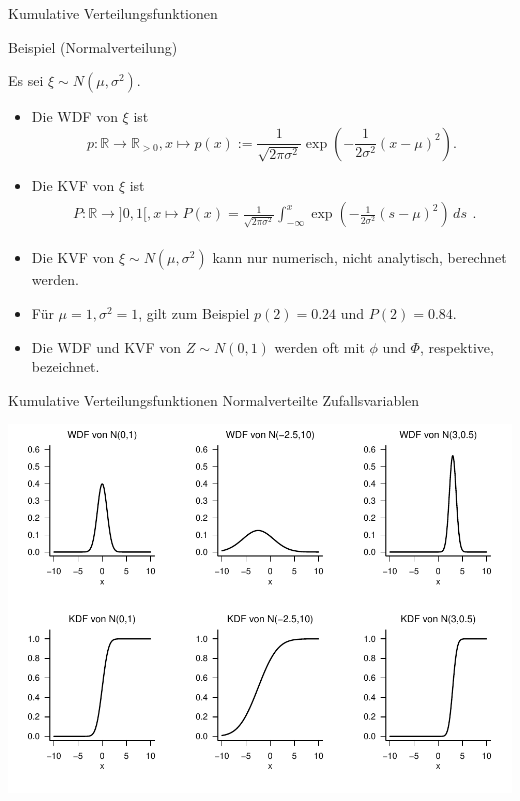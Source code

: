 \documentclass[
  8pt,
  ignorenonframetext,
]{beamer}
\begin{document}
\begin{frame}{Kumulative Verteilungsfunktionen}
\protect\hypertarget{kumulative-verteilungsfunktionen-9}{}
\begin{large}
Beispiel (Normalverteilung)
\end{large}

\small
\justifying

Es sei \(\xi \sim N(\mu,\sigma^2)\). 

\begin{itemize}
\item Die WDF von $\xi$ ist
\begin{equation*}
p : \mathbb{R} \to \mathbb{R}_{>0}, x \mapsto p(x)
:= \frac{1}{\sqrt{2\pi\sigma^2}}\exp\left(-\frac{1}{2\sigma^2}(x-\mu)^2\right).
\end{equation*}
\item Die KVF von $\xi$ ist
\begin{align*}
\begin{split}
P : \mathbb{R} \to ]0,1[, x \mapsto P(x)
 = \frac{1}{\sqrt{2\pi\sigma^2}}\int_{-\infty}^x\exp\left(-\frac{1}{2\sigma^2}(s -\mu)^2\right) \,ds
\end{split}.
\end{align*}
\item Die KVF von $\xi \sim N(\mu,\sigma^2)$ kann nur numerisch, nicht analytisch, berechnet werden.
\item Für $\mu = 1, \sigma^2 = 1$, gilt zum Beispiel $p(2) = 0.24$ und $P(2) = 0.84$.
\item Die WDF und KVF von $Z \sim N(0,1)$ werden oft mit  $\phi$ und $\Phi$, respektive, bezeichnet.
\end{itemize}
\end{frame}

\begin{frame}{Kumulative Verteilungsfunktionen}
\protect\hypertarget{kumulative-verteilungsfunktionen-10}{}
Normalverteilte Zufallsvariablen \vspace{.2cm}

\begin{center}\includegraphics[width=0.8\linewidth]{4_Abbildungen/wtfi_4_normalverteilung_kvf} \end{center}
\end{frame}
\end{document}
